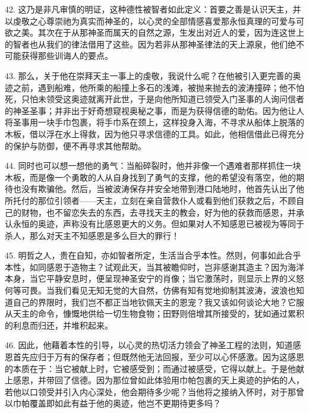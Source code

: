 42. 这乃是非凡审慎的明证，这种德性被智者如此定义：首要之善是认识天主，并以虔敬之心尊崇祂为真实而神圣的，以心灵的全部情感喜爱那永恒真理的可爱与可欲之美。其次在于从那神圣而属天的自然之源，生发出对近人的爱，因为连这世上的智者也从我们的律法借用了这些。因为若非从那神圣律法的天上源泉，他们绝不可能获得那些训诲人的要点。\par

43. 那么，关于他在崇拜天主一事上的虔敬，我说什么呢？在他被引入更完善的奥迹之前，遇到船难，他所乘的船撞上多石的浅滩，被抛来抛去的波涛撞碎；他不怕死，只怕未领受这奥迹就离开此世，于是向他所知道已领受入门圣事的人询问信者的神圣圣事；并非出于好奇想窥视奥秘之事，而是为获得信德的助佑。因为他让人将圣事用一块手巾包裹，将手巾系在颈上，这样投身入海，不寻求从船体上脱落的木板，借以浮在水上得救，因为他只寻求信德的工具。如此，他相信借此已得充分的保护与防御，便不再寻求其他帮助。\par

44. 同时也可以想一想他的勇气：当船碎裂时，他并非像一个遇难者那样抓住一块木板，而是像一个勇敢的人从自身找到了勇气的支撑，他的希望没有落空，他的期待也没有欺骗他。然后，当被波涛保存并安全地带到港口陆地时，他首先认出了他所托付的那位引领者——天主，立刻在亲自营救仆人或看到他们获救之后，不顾自己的财物，也不留恋失去的东西，去寻找天主的教会，好为他的获救而感恩，并承认永恒的奥迹，声称没有比感恩更大的义务。但如果对人不知感恩已被视为等同于杀人，那么对天主不知感恩是多么巨大的罪行！\par

45. 明哲之人，贵在自知，亦如智者所定，生活当合乎本性。然则，何事如此合乎本性，如同感恩于造物主？试观此天，当其被瞻仰时，岂非感谢其造主？因为海洋本身，当它平静安息时，便呈现神圣安宁的肖像；当它激荡时，则显示上界的义怒何等可畏。当我们看见无知无觉的大自然，仿佛有知有觉地抑制其波涛，波浪也知道自己的界限时，我们岂不都正当地钦佩天主的恩宠？我又该如何谈论大地？它服从天主的命令，慷慨地供给一切生物食物；田野则倍增其所接受的，犹如通过累积的利息而归还，并堆积起来。\par

46. 因此，他藉着本性的引导，以心灵的热切活力领会了神圣工程的法则，知道感恩首先应归于万有的保存者；但既然他无法回报，至少可以心怀感激。因为这感恩的本质在于：当它被献上时，它被感受到；而通过被感受，它得以献上。于是他献上感恩，并带回了信德。因为那位曾如此体验用巾帕包裹的天上奥迹的护佑的人，若他以口领受并引入内心深处，他会期待多少呢？当他将之接纳入怀时，对于那曾以巾帕覆盖即如此有益于他的奥迹，他岂不更期待更多吗？\par

